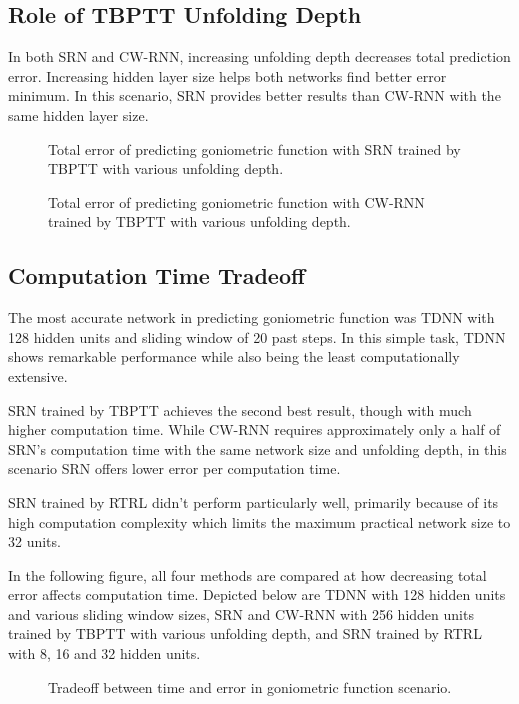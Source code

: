 \documentclass[12pt,oneside]{fithesis2}
\begin{document}
\subsection{Role of TBPTT Unfolding Depth}
In both SRN and CW-RNN, increasing unfolding depth decreases total prediction error. Increasing hidden layer size helps both networks find better error minimum. In this scenario, SRN provides better results than CW-RNN with the same hidden layer size.

	\begin{figure}[H]
		\caption{Total error of predicting goniometric function with SRN trained by TBPTT with various unfolding depth.}
		
		
		\caption{Total error of predicting goniometric function with CW-RNN trained by TBPTT with various unfolding depth.}
		
	\end{figure}

\subsection{Computation Time Tradeoff}
The most accurate network in predicting goniometric function was TDNN with 128 hidden units and sliding window of 20 past steps. In this simple task, TDNN shows remarkable performance while also being the least computationally extensive. \par
SRN trained by TBPTT achieves the second best result, though with much higher computation time. While CW-RNN requires approximately only a half of SRN's computation time with the same network size and unfolding depth, in this scenario SRN offers lower error per computation time.\par
SRN trained by RTRL didn't perform particularly well, primarily because of its high computation complexity which limits the maximum practical network size to 32 units.\par
In the following figure, all four methods are compared at how decreasing total error affects computation time. Depicted below are TDNN with 128 hidden units and various sliding window sizes, SRN and CW-RNN with 256 hidden units trained by TBPTT with various unfolding depth, and SRN trained by RTRL with 8, 16 and 32 hidden units.

	\begin{figure}[H]
		\caption{Tradeoff between time and error in goniometric function scenario.}
		
	\end{figure}
\end{document}
